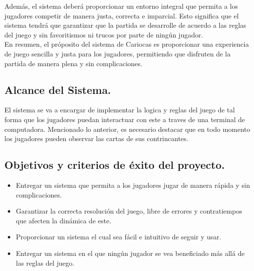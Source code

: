 Además, el sistema deberá proporcionar un entorno integral que permita a los jugadores competir de manera justa, 
correcta e imparcial. Esto significa que el sistema tendrá que garantizar que la partida se desarrolle de acuerdo a las reglas del juego y sin 
favoritismos ni trucos por parte de ningún jugador.\\

En resumen, el próposito del sistema de Cariocas es proporcionar una experiencia de juego sencilla y justa para los 
jugadores, permitiendo que disfruten de la partida de manera plena y sin complicaciones.

\subsection{Alcance del Sistema.}\label{cap:alcance}
El sistema se va a encargar de implementar la logica y reglas del juego de tal forma que los jugadores puedan
interactuar con este a traves de una terminal de computadora. Mencionado lo anterior, es necesario destacar 
que en todo momento los jugadores pueden observar las cartas de sus contrincantes.

\subsection{Objetivos y criterios de éxito del proyecto.}\label{cap:objetivos}
\begin{itemize}
    \item Entregar un sistema que permita a los jugadores jugar de manera rápida y sin complicaciones.
    \item Garantizar la correcta resolución del juego, libre de errores y contratiempos que afecten la dinámica de este.
    \item Proporcionar un sistema el cual sea fácil e intuitivo de seguir y usar.
    \item Entregar un sistema en el que ningún jugador se vea beneficiado más allá de las reglas del juego.
\end{itemize}


